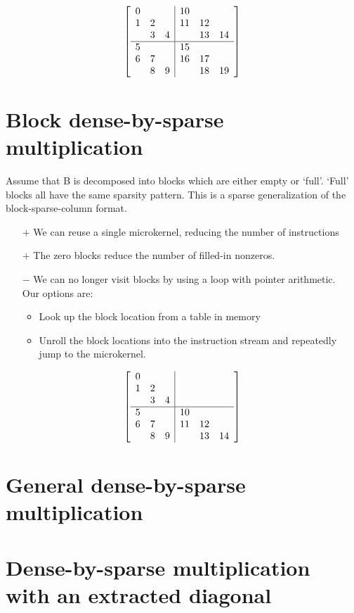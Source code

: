       \[
      \left[
          \begin{array}{c c c | c c c }
          0 &   &   & 10 &   &   \\
          1 & 2 &   & 11& 12&   \\
            & 3 & 4 &   & 13& 14  \\
          \hline
          5 &   &   & 15  &   &   \\
          6 & 7 &   & 16  &17   &   \\
            & 8 & 9 &   & 18  &19   \\
          \end{array}
          \right]
      \]

\section{Block dense-by-sparse multiplication}

  Assume that B is decomposed into blocks which are either empty or `full'. `Full' blocks all have the same sparsity pattern. This is a sparse generalization of the block-sparse-column format.

  \begin{itemize}
  \item[$+$] We can reuse a single microkernel, reducing the number of instructions
  \item[$+$] The zero blocks reduce the number of filled-in nonzeros.
  \item[$-$] We can no longer visit blocks by using a loop with pointer arithmetic. \\Our options are:
    \begin{itemize}
    \item Look up the block location from a table in memory
    \item Unroll the block locations into the instruction stream and repeatedly jump to the microkernel.
    \end{itemize}
  \end{itemize}

      \[
      \left[
          \begin{array}{c c c | c c c }
          0 &   &   &    &    &    \\
          1 & 2 &   &    &    &    \\
            & 3 & 4 &    &    &    \\
          \hline
          5 &   &   & 10 &    &    \\
          6 & 7 &   & 11 & 12 &    \\
            & 8 & 9 &    & 13 & 14 \\
          \end{array}
          \right]
      \]
\section{General dense-by-sparse multiplication}
\section{Dense-by-sparse multiplication with an extracted diagonal}
